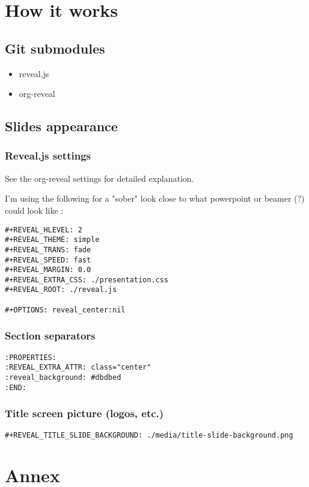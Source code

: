 \documentclass[a4paper]{article}
\begin{document}
\section{How it works}
\label{sec:org9cf0059}
\subsection{Git submodules}
\label{sec:org991fad6}

\begin{itemize}
\item reveal.js
\item org-reveal
\end{itemize}

\subsection{Slides appearance}
\label{sec:org085870f}

\subsubsection{Reveal.js settings}
\label{sec:org45b4d62}

See the org-reveal settings for detailed explanation.

I'm using the following for a "sober" look close to what
powerpoint or beamer (?) could look like :

\begin{verbatim}
#+REVEAL_HLEVEL: 2
#+REVEAL_THEME: simple
#+REVEAL_TRANS: fade
#+REVEAL_SPEED: fast
#+REVEAL_MARGIN: 0.0
#+REVEAL_EXTRA_CSS: ./presentation.css
#+REVEAL_ROOT: ./reveal.js

#+OPTIONS: reveal_center:nil
\end{verbatim}
\subsubsection{Section separators}
\label{sec:orgd3fc9af}

\begin{verbatim}
:PROPERTIES:
:REVEAL_EXTRA_ATTR: class="center"
:reveal_background: #dbdbed
:END:
\end{verbatim}


\subsubsection{Title screen picture (logos, etc.)}
\label{sec:org6881592}

\begin{verbatim}
#+REVEAL_TITLE_SLIDE_BACKGROUND: ./media/title-slide-background.png
\end{verbatim}


\section{Annex}
\label{sec:org3eba9b0}
\end{document}
